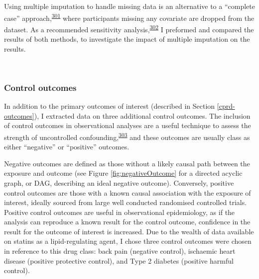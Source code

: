 \documentclass[a4paper, twoside]{templates/ociamthesis}
\begin{document}
Using multiple imputation to handle missing data is an alternative to a ``complete case'' approach,\textsuperscript{\protect\hyperlink{ref-pigott2001}{301}} where participants missing any covariate are dropped from the dataset. As a recommended sensitivity analysis,\textsuperscript{\protect\hyperlink{ref-hughes2019}{302}} I preformed and compared the results of both methods, to investigate the impact of multiple imputation on the results.

~

\hypertarget{control-outcomes}{%
\subsubsection{Control outcomes}\label{control-outcomes}}

In addition to the primary outcomes of interest (described in Section \ref{cprd-outcomes}), I extracted data on three additional control outcomes. The inclusion of control outcomes in observational analyses are a useful technique to assess the strength of uncontrolled confounding,\textsuperscript{\protect\hyperlink{ref-lipsitch2010}{303}} and these outcomes are usually class as either ``negative'' or ``positive'' outcomes.

Negative outcomes are defined as those without a likely causal path between the exposure and outcome (see Figure \ref{fig:negativeOutcome} for a directed acyclic graph, or DAG, describing an ideal negative outcome). Conversely, positive control outcomes are those with a known causal association with the exposure of interest, ideally sourced from large well conducted randomised controlled trials. Positive control outcomes are useful in observational epidemiology, as if the analysis can reproduce a known result for the control outcome, confidence in the result for the outcome of interest is increased. Due to the wealth of data available on statins as a lipid-regulating agent, I chose three control outcomes were chosen in reference to this drug class: back pain (negative control), ischaemic heart disease (positive protective control), and Type 2 diabetes (positive harmful control).

~\\
\end{document}

